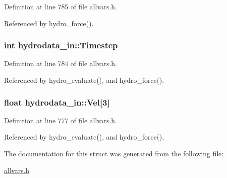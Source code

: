 Definition at line 785 of file allvars.h.



Referenced by hydro\_\-force().

\hypertarget{structhydrodata__in_a6b2160624adc7ad0304597845531ffa7}{
\subsubsection[{Timestep}]{\setlength{\rightskip}{0pt plus 5cm}int {\bf hydrodata\_\-in::Timestep}}}
\label{structhydrodata__in_a6b2160624adc7ad0304597845531ffa7}


Definition at line 784 of file allvars.h.



Referenced by hydro\_\-evaluate(), and hydro\_\-force().

\hypertarget{structhydrodata__in_aac935e4620b7700cae000a32a2922df4}{
\subsubsection[{Vel}]{\setlength{\rightskip}{0pt plus 5cm}float {\bf hydrodata\_\-in::Vel}\mbox{[}3\mbox{]}}}
\label{structhydrodata__in_aac935e4620b7700cae000a32a2922df4}


Definition at line 777 of file allvars.h.



Referenced by hydro\_\-evaluate(), and hydro\_\-force().



The documentation for this struct was generated from the following file:\begin{DoxyCompactItemize}
\item 
\hyperlink{allvars_8h}{allvars.h}\end{DoxyCompactItemize}
